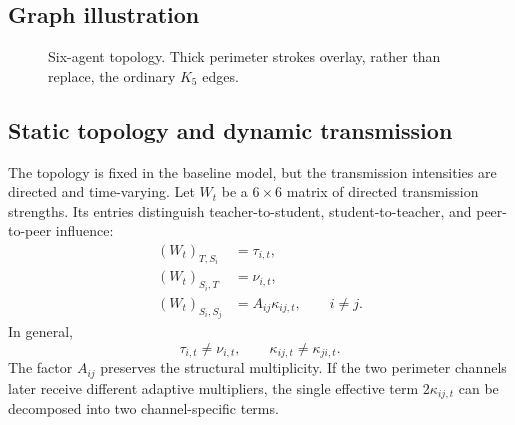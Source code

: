\documentclass[11pt,a4paper]{article}
\begin{document}
\subsection{Graph illustration}

\begin{figure}[ht]
\centering
{}
\caption{Six-agent topology. Thick perimeter strokes overlay, rather than replace, the ordinary \(K_5\) edges.}
\label{fig:network}
\end{figure}

\subsection{Static topology and dynamic transmission}

The topology is fixed in the baseline model, but the transmission intensities are directed and time-varying. Let \(W_t\) be a \(6\times6\) matrix of directed transmission strengths. Its entries distinguish teacher-to-student, student-to-teacher, and peer-to-peer influence:
\begin{align}
(W_t)_{T,S_i}&=\tau_{i,t},\\
(W_t)_{S_i,T}&=\nu_{i,t},\\
(W_t)_{S_i,S_j}&=A_{ij}\kappa_{ij,t},\qquad i\ne j.
\end{align}
In general,
\begin{equation}
\tau_{i,t}\ne\nu_{i,t},
\qquad
\kappa_{ij,t}\ne\kappa_{ji,t}.
\end{equation}
The factor \(A_{ij}\) preserves the structural multiplicity. If the two perimeter channels later receive different adaptive multipliers, the single effective term \(2\kappa_{ij,t}\) can be decomposed into two channel-specific terms.
\end{document}
